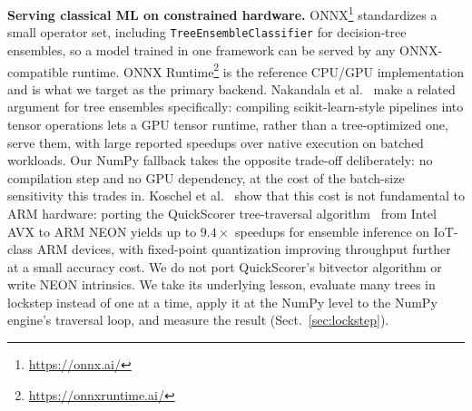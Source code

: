 \documentclass[runningheads]{llncs}
\begin{document}
\textbf{Serving classical ML on constrained hardware.} ONNX\footnote{\url{https://onnx.ai/}} standardizes a small operator set, including \texttt{TreeEnsembleClassifier} for decision-tree ensembles, so a model trained in one framework can be served by any ONNX-compatible runtime. ONNX Runtime\footnote{\url{https://onnxruntime.ai/}} is the reference CPU/GPU implementation and is what we target as the primary backend. Nakandala et al.~\cite{nakandala2020hummingbird} make a related argument for tree ensembles specifically: compiling scikit-learn-style pipelines into tensor operations lets a GPU tensor runtime, rather than a tree-optimized one, serve them, with large reported speedups over native execution on batched workloads. Our NumPy fallback takes the opposite trade-off deliberately: no compilation step and no GPU dependency, at the cost of the batch-size sensitivity this trades in. Koschel et al.~\cite{koschel2023arm} show that this cost is not fundamental to ARM hardware: porting the QuickScorer tree-traversal algorithm~\cite{lucchese2015quickscorer} from Intel AVX to ARM NEON yields up to $9.4\times$ speedups for ensemble inference on IoT-class ARM devices, with fixed-point quantization improving throughput further at a small accuracy cost. We do not port QuickScorer's bitvector algorithm or write NEON intrinsics. We take its underlying lesson, evaluate many trees in lockstep instead of one at a time, apply it at the NumPy level to the NumPy engine's traversal loop, and measure the result (Sect.~\ref{sec:lockstep}).
\end{document}
